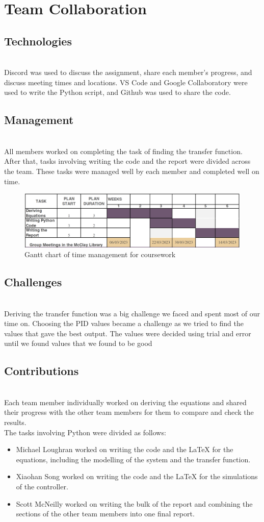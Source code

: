 
\section{Team Collaboration}
\subsection*{Technologies}
\hfill \\
Discord was used to discuss the assignment, share each member’s progress, and discuss meeting times and locations. VS Code and Google Collaboratory were used to write the Python script, and Github was used to share the code. 
\subsection*{Management}\hfill \\
All members worked on completing the task of finding the transfer function. After that, tasks involving writing the code and the report were divided across the team. These tasks were managed well by each member and completed well on time.
\begin{figure}[ht]
    \includegraphics[width=0.8\linewidth]{Team collaboration/Screenshot 2023-04-16 at 19.28.44.png}
    \caption{Gantt chart of time management for coursework}
\end{figure}
\subsection*{Challenges}\hfill \\
Deriving the transfer function was a big challenge we faced and spent most of our time on.  
Choosing the PID values became a challenge as we tried to find the values that gave the best output. The values were decided using trial and error until we found values that we found to be good 
\subsection*{Contributions}\hfill \\
Each team member individually worked on deriving the equations and shared their progress with the other team members for them to compare and check the results.
\\
The tasks involving Python were divided as follows:
\begin{itemize}
  \item Michael Loughran worked on writing the code and the LaTeX for the equations, including the modelling of the system and the transfer function.
  \item Xiaohan Song worked on writing the code and the LaTeX for the simulations of the controller.
  \item Scott McNeilly worked on writing the bulk of the report and combining the sections of the other team members into one final report.
\end{itemize}
